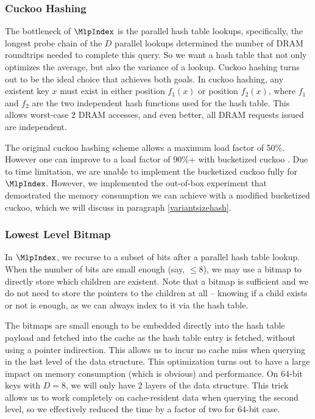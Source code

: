 \documentclass[11pt, usletter]{article}
\begin{document}
\subsubsection*{Cuckoo Hashing}

The bottleneck of $\MlpIndex$ is the parallel hash table lookups, 
specifically, the longest probe chain of the $D$ parallel lookups determined the number 
of DRAM roundtrips needed to complete this query. 
So we want a hash table that not only optimizes the average, but also the variance of a lookup. 
Cuckoo hashing \cite{cuckoohash} turns out to be the ideal choice that achieves both goals. 
In cuckoo hashing, any existent key $x$ must exist in either position $f_1(x)$ 
or position $f_2(x)$, where $f_1$ and $f_2$ are the two independent hash functions used for the hash table.
This allows worst-case 2 DRAM accesses, and even better, all DRAM requests issued are independent. 

The original cuckoo hashing scheme allows a maximum load factor of 50\%. 
However one can improve to a load factor of 90\%+ with bucketized cuckoo \cite{bucketcuckoo}. 
Due to time limitation, we are unable to implement the bucketized cuckoo fully for $\MlpIndex$. 
However, we implemented the out-of-box experiment that 
demostrated the memory consumption we can achieve with a modified bucketized cuckoo, 
which we will discuss in paragraph \ref{variantsizehash}.

\subsubsection*{Lowest Level Bitmap} \label{lowestlevelbitmap}

In $\MlpIndex$, we recurse to a subset of bits after a parallel hash table lookup. 
When the number of bits are small enough (say, $\leq 8$), we may use a bitmap 
to directly store which children are existent. 
Note that a bitmap is sufficient and we do not need to store the pointers to the children at all -- 
knowing if a child exists or not is enough, as we can always index to it via the hash table.

The bitmaps are small enough to be embedded directly into the hash table payload 
and fetched into the cache as the hash table entry is fetched, without using a pointer indirection. 
This allows us to incur no cache miss when querying in the last level of the data structure. 
This optimization turns out to have a large impact on memory consumption (which is obvious) and performance. 
On 64-bit keys with $D=8$, we will only have 2 layers of the data structure. 
This trick allows us to work completely on cache-resident data when querying the second level, 
so we effectively reduced the time by a factor of two for 64-bit case.
\end{document}
